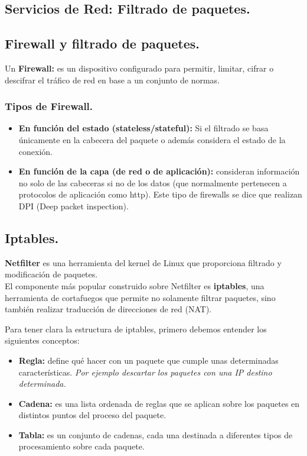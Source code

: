\begin{onepage}


\section{Servicios de Red: Filtrado de paquetes.}
\subsection{Firewall y filtrado de paquetes.}
Un \textbf{Firewall:} es un dispositivo configurado para permitir, limitar, cifrar o descifrar el tráfico de red en base a un conjunto de normas.

\subsubsection{Tipos de Firewall.}
\begin{itemize}
    \item \textbf{En función del estado (stateless/stateful): }Si el filtrado se basa únicamente en la cabecera del paquete o además considera el estado de la conexión.
    \item \textbf{En función de la capa (de red o de aplicación):} consideran información no solo de las cabeceras si no de los datos (que normalmente pertenecen a protocolos de aplicación como http). Este tipo de firewalls se dice que realizan DPI (Deep packet inspection).
\end{itemize}

\subsection{Iptables.}
\textbf{Netfilter} es una herramienta del kernel de Linux que proporciona filtrado y modificación de paquetes.\\

El componente más popular construido sobre Netfilter es \textbf{iptables}, una herramienta de cortafuegos que permite no solamente filtrar paquetes, sino también realizar traducción de direcciones de red (NAT).\\
\begin{tcolorbox}[
colback=yellow!5!white,
colframe=yellow!75!cyan,
fonttitle=\bfseries]
Para tener clara la estructura de iptables, primero debemos entender los siguientes conceptos:
\begin{itemize}
    \item \textbf{Regla: }define qué hacer con un paquete que cumple unas determinadas características. \textit{Por ejemplo descartar los paquetes con una IP destino determinada.}
    \item \textbf{Cadena: }es una lista ordenada de reglas que se aplican sobre los paquetes en distintos puntos del proceso del paquete.
    \item \textbf{Tabla: }es un conjunto de cadenas, cada una destinada a diferentes tipos de procesamiento sobre cada paquete.
\end{itemize}
\end{tcolorbox}
\end{onepage}


